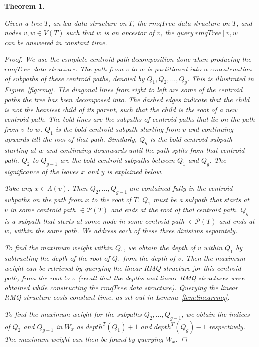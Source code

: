 \documentclass[12pt,a4paper]{article}
\newcommand{\leafset}{\Lambda}
\newtheorem{rmqquery}[incompatibility]{Theorem}
\begin{document}
    \medskip
    \begin{rmqquery}
        \label{lem:rmqquery}

        Given a tree $T$, an $lca$ data structure on $T$, the $rmqTree$ data structure on $T$, and nodes $v, w \in V(T)$ such that $w$ is an ancestor of $v$, the query $rmqTree[v, w]$ can be answered in constant time.

        \begin{proof}
            We use the complete centroid path decomposition done when producing the $rmqTree$ data structure. The path from $v$ to $w$ is partitioned into a concatenation of subpaths of these centroid paths, denoted by $Q_1, Q_2, ..., Q_g$. This is illustrated in Figure~\ref{fig:rmq}. The diagonal lines from right to left are some of the centroid paths the tree has been decomposed into. The dashed edges indicate that the child is not the heaviest child of its parent, such that the child is the root of a new centroid path. The bold lines are the subpaths of centroid paths that lie on the path from $v$ to $w$. $Q_1$ is the bold centroid subpath starting from $v$ and continuing upwards till the root of that path. Similarly, $Q_g$ is the bold centroid subpath starting at $w$ and continuing downwards until the path splits from that centroid path. $Q_2$ to $Q_{g - 1}$ are the bold centroid subpaths between $Q_1$ and $Q_g$. The significance of the leaves $x$ and $y$ is explained below.

            Take any $x \in \leafset(v)$. Then $Q_2, ..., Q_{g - 1}$ are contained fully in the centroid subpaths on the path from $x$ to the root of $T$. $Q_1$ must be a subpath that starts at $v$ in some centroid path $\in \mathcal{P}(T)$ and ends at the root of that centroid path. $Q_g$ is a subpath that starts at some node in some centroid path $\in \mathcal{P}(T)$ and ends at $w$, within the same path. We address each of these three divisions separately.

            To find the maximum weight within $Q_1$, we obtain the depth of $v$ within $Q_1$ by subtracting the depth of the root of $Q_1$ from the depth of $v$. Then the maximum weight can be retrieved by querying the linear RMQ structure for this centroid path, from the root to $v$ (recall that the depths and linear RMQ structures were obtained while constructing the $rmqTree$ data structure). Querying the linear RMQ structure costs constant time, as set out in Lemma~\ref{lem:linearrmq}.

            To find the maximum weight for the subpaths $Q_2, ..., Q_{g - 1}$, we obtain the indices of $Q_2$ and $Q_{g-1}$ in $W_x$ as $depth^{T}(Q_1) + 1$ and $depth^{T}(Q_g) - 1$ respectively. The maximum weight can then be found by querying $W_x$.


\end{proof}
\end{rmqquery}
\end{document}
